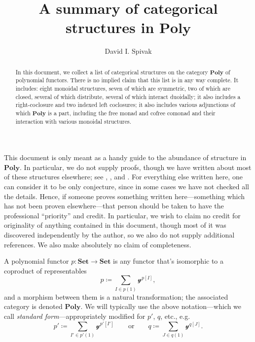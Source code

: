 \documentclass[11pt, one side, article]{memoir}
\theoremstyle{definition}
\theoremstyle{plain}
\newcommand{\Cat}[1]{\mathbf{#1}}%
\newcommand{\smset}{\Cat{Set}}
\newcommand{\yon}{\mathcal{y}}
\newcommand{\poly}{\Cat{Poly}}
\newcommand{\0}{\textsf{0}}
\newcommand{\1}{\tn{\textsf{1}}}
\newcommand{\qqor}{\qquad\text{or}\qquad}
\begin{document}
\title{A summary of categorical structures in $\poly$}

\author{David I. Spivak}


\maketitle

\begin{abstract}
In this document, we collect a list of categorical structures on the category $\poly$ of polynomial functors. There is no implied claim that this list is in any way complete. It includes: eight monoidal structures, seven of which are symmetric, two of which are closed, several of which distribute, several of which interact duoidally; it also includes a right-coclosure and two indexed left coclosures; it also includes various adjunctions of which $\poly$ is a part, including the free monad and cofree comonad and their interaction with various monoidal structures. 
\end{abstract}


\tableofcontents*
\bigskip

This document is only meant as a handy guide to the abundance of structure in $\poly$. In particular, we do not supply proofs, though we have written about most of these structures elsewhere; see \cite{spivak2022poly}, \cite{spivak2021functorial}, and \cite{spivak2022polynomial}. For everything else written here, one can consider it to be only conjecture, since in some cases we have not checked all the details. Hence, if someone proves something written here---something which has not been proven elsewhere---that person should be taken to have the professional ``priority'' and credit. In particular, we wish to claim no credit for originality of anything contained in this document, though most of it was discovered independently by the author, so we also do not supply additional references. We also make absolutely no claim of completeness.

\bigskip

A polynomial functor $p\colon\smset\to\smset$ is any functor that's isomorphic to a coproduct of representables
\[
p\coloneqq\sum_{I\in p(1)}\yon^{p[I]},
\]
and a morphism between them is a natural transformation; the associated category is denoted $\poly$. 
We will typically use the above notation---which we call \emph{standard form}---appropriately modified for $p'$, $q$, etc., e.g.
\[
p'\coloneqq\sum_{I'\in p'(1)}\yon^{p'[I']}
\qqor
q\coloneqq\sum_{J\in q(1)}\yon^{q[J]}.
\]
\end{document}
